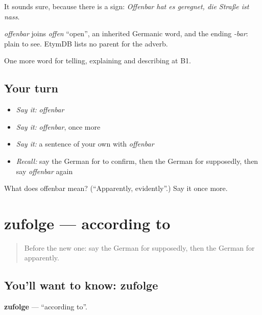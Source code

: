 It sounds sure, because there is a sign: \emph{Offenbar hat es geregnet, die Straße ist nass}.

\begin{cousinweb}
\emph{offenbar} joins \emph{offen} \textquotedblleft{}open\textquotedblright{}, an inherited Germanic word, and the ending \emph{-bar}: plain to see. EtymDB lists no parent for the adverb.
\end{cousinweb}

\begin{grammarlens}[title={What you've built}]
One more word for telling, explaining and describing at B1.
\end{grammarlens}

\subsection*{Your turn}
\begin{itemize}
\raggedright
  \item \emph{Say it:} \emph{offenbar}
  \item \emph{Say it:} \emph{offenbar}, once more
  \item \emph{Say it:} a sentence of your own with \emph{offenbar}
  \item \emph{Recall:} say the German for to confirm, then the German for supposedly, then say \emph{offenbar} again
\end{itemize}

\begin{tcolorbox}[breakable,colback=teal!4,colframe=teal!35!black,title={Before you move on}]
What does offenbar mean? (\textquotedblleft{}Apparently, evidently\textquotedblright{}.) Say it once more.
\end{tcolorbox}
\section[zufolge]{zufolge — according to}

\label{lesson:GE-C275-zufolge}



\begin{quote}
Before the new one: say the German for supposedly, then the German for apparently.
\end{quote}

\subsection*{You'll want to know: zufolge}
\textbf{zufolge} — \textquotedblleft{}according to\textquotedblright{}.

